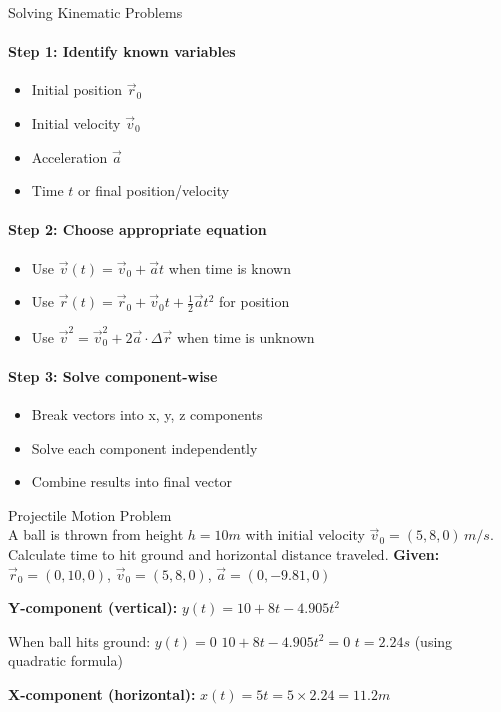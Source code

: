\begin{KR}{Solving Kinematic Problems}\\
    \paragraph{Step 1: Identify known variables}
    \begin{itemize}
        \item Initial position $\vec{r}_0$
        \item Initial velocity $\vec{v}_0$
        \item Acceleration $\vec{a}$
        \item Time $t$ or final position/velocity
    \end{itemize}
    
    \paragraph{Step 2: Choose appropriate equation}
    \begin{itemize}
        \item Use $\vec{v}(t) = \vec{v}_0 + \vec{a}t$ when time is known
        \item Use $\vec{r}(t) = \vec{r}_0 + \vec{v}_0 t + \frac{1}{2}\vec{a}t^2$ for position
        \item Use $\vec{v}^2 = \vec{v}_0^2 + 2\vec{a} \cdot \Delta\vec{r}$ when time is unknown
    \end{itemize}
    
    \paragraph{Step 3: Solve component-wise}
    \begin{itemize}
        \item Break vectors into x, y, z components
        \item Solve each component independently
        \item Combine results into final vector
    \end{itemize}
\end{KR}

\begin{example2}{Projectile Motion Problem}\\
    A ball is thrown from height $h = 10m$ with initial velocity $\vec{v}_0 = (5, 8, 0) \, m/s$. Calculate time to hit ground and horizontal distance traveled.
    \tcblower
    \textbf{Given:} $\vec{r}_0 = (0, 10, 0)$, $\vec{v}_0 = (5, 8, 0)$, $\vec{a} = (0, -9.81, 0)$
    
    \textbf{Y-component (vertical):}
    $y(t) = 10 + 8t - 4.905t^2$
    
    When ball hits ground: $y(t) = 0$
    $10 + 8t - 4.905t^2 = 0$
    $t = 2.24s$ (using quadratic formula)
    
    \textbf{X-component (horizontal):}
    $x(t) = 5t = 5 \times 2.24 = 11.2m$
\end{example2}